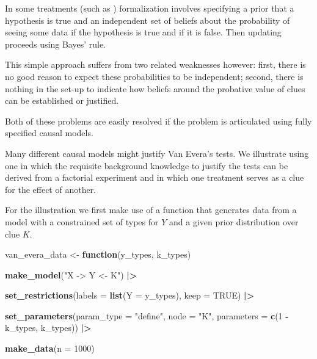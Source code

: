 \documentclass[
  12pt,
]{book}
\newenvironment{Shaded}{\begin{snugshade}}{\end{snugshade}}
\newcommand{\AttributeTok}[1]{\textcolor[rgb]{0.13,0.29,0.53}{#1}}
\newcommand{\ConstantTok}[1]{\textcolor[rgb]{0.56,0.35,0.01}{#1}}
\newcommand{\ControlFlowTok}[1]{\textcolor[rgb]{0.13,0.29,0.53}{\textbf{#1}}}
\newcommand{\DecValTok}[1]{\textcolor[rgb]{0.00,0.00,0.81}{#1}}
\newcommand{\FunctionTok}[1]{\textcolor[rgb]{0.13,0.29,0.53}{\textbf{#1}}}
\newcommand{\NormalTok}[1]{#1}
\newcommand{\OtherTok}[1]{\textcolor[rgb]{0.56,0.35,0.01}{#1}}
\newcommand{\SpecialCharTok}[1]{\textcolor[rgb]{0.81,0.36,0.00}{\textbf{#1}}}
\newcommand{\StringTok}[1]{\textcolor[rgb]{0.31,0.60,0.02}{#1}}
\begin{document}
In some treatments (such as \citet{humphreys2015mixing}) formalization involves specifying a prior that a hypothesis is true and an independent set of beliefs about the probability of seeing some data if the hypothesis is true and if it is false. Then updating proceeds using Bayes' rule.

This simple approach suffers from two related weaknesses however: first, there is no good reason to expect these probabilities to be independent; second, there is nothing in the set-up to indicate how beliefs around the probative value of clues can be established or justified.

Both of these problems are easily resolved if the problem is articulated using fully specified causal models.

Many different causal models might justify Van Evera's tests. We illustrate using one in which the requisite background knowledge to justify the tests can be derived from a factorial experiment and in which one treatment serves as a clue for the effect of another.

For the illustration we first make use of a function that generates data from a model with a constrained set of types for \(Y\) and a given prior distribution over clue \(K\).

\begin{Shaded}
\begin{Highlighting}[]
\NormalTok{van\_evera\_data }\OtherTok{\textless{}{-}} \ControlFlowTok{function}\NormalTok{(y\_types, k\_types)}
  
  \FunctionTok{make\_model}\NormalTok{(}\StringTok{"X {-}\textgreater{} Y \textless{}{-} K"}\NormalTok{) }\SpecialCharTok{|\textgreater{}}
  
  \FunctionTok{set\_restrictions}\NormalTok{(}\AttributeTok{labels =} \FunctionTok{list}\NormalTok{(}\AttributeTok{Y =}\NormalTok{ y\_types), }\AttributeTok{keep =} \ConstantTok{TRUE}\NormalTok{) }\SpecialCharTok{|\textgreater{}}
  
  \FunctionTok{set\_parameters}\NormalTok{(}\AttributeTok{param\_type =} \StringTok{"define"}\NormalTok{, }\AttributeTok{node =} \StringTok{"K"}\NormalTok{, }\AttributeTok{parameters =} \FunctionTok{c}\NormalTok{(}\DecValTok{1} \SpecialCharTok{{-}}\NormalTok{ k\_types, k\_types)) }\SpecialCharTok{|\textgreater{}}
  
  \FunctionTok{make\_data}\NormalTok{(}\AttributeTok{n =} \DecValTok{1000}\NormalTok{)}
\end{Highlighting}
\end{Shaded}
\end{document}
